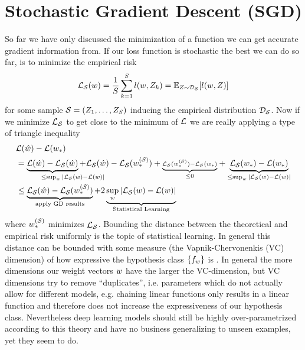 
\chapter{Stochastic Gradient Descent (SGD)}\label{chap: sgd}

So far we have only discussed the minimization of a function we can get accurate
gradient information from. If our loss function is stochastic the best we can
do so far, is to minimize the empirical risk
\begin{align*}
	\mathcal{L}_{\mathcal{S}}(w) = \frac{1}{S}\sum_{k=1}^S l(w, Z_k)
	= \mathbb{E}_{Z\sim \mathcal{D}_{\mathcal{S}}}[l(w, Z)]
\end{align*}
for some sample \(\mathcal{S}=(Z_1,\dots,Z_S)\) inducing the empirical
distribution \(\mathcal{D}_{\mathcal{S}}\). Now if we minimize \(\mathcal{L}_{\mathcal{S}}\) to
get close to the minimum of \(\mathcal{L}\) we are really applying a type of triangle
inequality \parencite[e.g.][]{bottouOptimizationMethodsLargeScale2018}
\begin{align*}
	&\Loss(\hat{\weights}) - \Loss(\minimum)\\
	&=
	\underbrace{\Loss(\hat{\weights}) - \Loss_\sample(\hat{\weights})}_{
	\le \sup_{\weights}|\mathrlap{\Loss_\sample(\weights)-\Loss(\weights)|}
	}
	{
	+ \Loss_\sample(\hat{\weights}) - \Loss_\sample(\minimum^{(\sample)})
	+ \underbrace{
		\scriptstyle
		\Loss_\sample(\minimum^{(\sample)}) - \Loss_\sample(\minimum)
	}_{\le 0}
	}
	+ \underbrace{
		\Loss_\sample(\minimum)- \Loss(\minimum)
	}_{\le \sup_{\weights}|\Loss_\sample(\weights)-\Loss(\weights)|}
	\\
	&\le \underbrace{\Loss_\sample(\hat{\weights}) - \Loss_\sample(\minimum^{(\sample)})}_{
		\text{apply GD results}
	}
	+ 2\underbrace{\sup_{\weights}|\Loss_\sample(\weights)-\Loss(\weights)|}_{\text{Statistical Learning}}
\end{align*}
where \(w_*^{(\mathcal{S})}\) minimizes \(\mathcal{L}_{\mathcal{S}}\). Bounding the
distance between the theoretical and empirical risk uniformly is the topic
of statistical learning. In general this distance can be bounded with some
measure (the Vapnik-Chervonenkis (VC) dimension) of how expressive the
hypothesis class \(\{f_{w}\}\) is \parencite{vapnikOverviewStatisticalLearning1999}.
In general the more dimensions our weight vectors \(w\) have the larger
the VC-dimension, but VC dimensions try to remove ``duplicates'', i.e.
parameters which do not actually allow for different models, e.g. chaining
linear functions only results in a linear function and therefore does not
increase the expressiveness of our hypothesis class. Nevertheless deep learning
models should still be highly over-parametrized according to this theory and
have no business generalizing to unseen examples, yet they seem to do.

